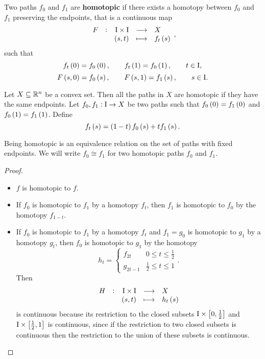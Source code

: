 \begin{definition*}
Two paths $ f_0 $ and $ f_1 $ are \textbf{homotopic} if there exists a homotopy between $ f_0 $ and $ f_1 $ preserving the endpoints, that is a continuous map
$$ \function[F]{\I \times \I}{X}{\br{s, t}}{f_t\br{s}}, $$
such that
$$ f_t\br{0} = f_0\br{0}, \qquad f_t\br{1} = f_0\br{1}, \qquad t \in \I, $$
$$ F\br{s, 0} = f_0\br{s}, \qquad F\br{s, 1} = f_1\br{s}, \qquad s \in \I. $$
\end{definition*}

\begin{example*}
Let $ X \subseteq \mathbb{R}^n $ be a convex set. Then all the paths in $ X $ are homotopic if they have the same endpoints. Let $ f_0, f_1 : \mathrm{I} \to X $ be two paths such that $ f_0\br{0} = f_1\br{0} $ and $ f_0\br{1} = f_1\br{1} $. Define
$$ f_t\br{s} = \br{1 - t}f_0\br{s} + tf_1\br{s}. $$
\end{example*}

\begin{lemma}
Being homotopic is an equivalence relation on the set of paths with fixed endpoints. We will write $ f_0 \cong f_1 $ for two homotopic paths $ f_0 $ and $ f_1 $.
\end{lemma}

\begin{proof}
\hfill
\begin{itemize}
\item $ f $ is homotopic to $ f $.
\item If $ f_0 $ is homotopic to $ f_1 $ by a homotopy $ f_t $, then $ f_1 $ is homotopic to $ f_0 $ by the homotopy $ f_{1 - t} $.
\item If $ f_0 $ is homotopic to $ f_1 $ by a homotopy $ f_t $ and $ f_1 = g_0 $ is homotopic to $ g_1 $ by a homotopy $ g_t $, then $ f_0 $ is homotopic to $ g_1 $ by the homotopy
$$ h_t =
\begin{cases}
f_{2t} & 0 \le t \le \tfrac{1}{2} \\
g_{2t - 1} & \tfrac{1}{2} \le t \le 1
\end{cases}.
$$
Then
$$ \function[H]{\I \times \I}{X}{\br{s, t}}{h_t\br{s}} $$
is continuous because its restriction to the closed subsets $ \I \times \sbr{0, \tfrac{1}{2}} $ and $ \I \times \sbr{\tfrac{1}{2}, 1} $ is continuous, since if the restriction to two closed subsets is continuous then the restriction to the union of these subsets is continuous.
\end{itemize}
\end{proof}


